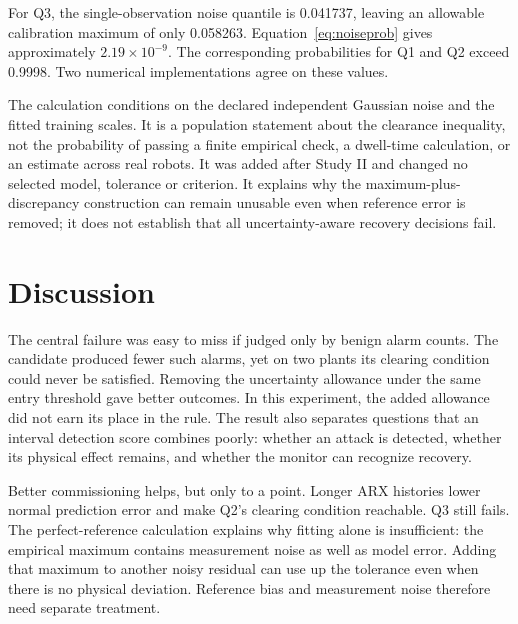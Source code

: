 \documentclass[11pt]{article}
\begin{document}
\begin{table}[htbp]\centering\small
\caption{Conditional perfect-reference diagnostic with $N=5{,}500$, $\delta=0.1$ and $\gamma=0.95$. The final column is the probability that a noise-only calibration maximum leaves enough margin for 95\% population feasibility.}\label{tab:noise}

\end{table}

For Q3, the single-observation noise quantile is 0.041737, leaving an allowable calibration maximum of only 0.058263. Equation~\ref{eq:noiseprob} gives approximately $2.19\times10^{-9}$. The corresponding probabilities for Q1 and Q2 exceed 0.9998. Two numerical implementations agree on these values.

The calculation conditions on the declared independent Gaussian noise and the fitted training scales. It is a population statement about the clearance inequality, not the probability of passing a finite empirical check, a dwell-time calculation, or an estimate across real robots. It was added after Study II and changed no selected model, tolerance or criterion. It explains why the maximum-plus-discrepancy construction can remain unusable even when reference error is removed; it does not establish that all uncertainty-aware recovery decisions fail.



\section{Discussion}
The central failure was easy to miss if judged only by benign alarm counts. The candidate produced fewer such alarms, yet on two plants its clearing condition could never be satisfied. Removing the uncertainty allowance under the same entry threshold gave better outcomes. In this experiment, the added allowance did not earn its place in the rule. The result also separates questions that an interval detection score combines poorly: whether an attack is detected, whether its physical effect remains, and whether the monitor can recognize recovery.

Better commissioning helps, but only to a point. Longer ARX histories lower normal prediction error and make Q2's clearing condition reachable. Q3 still fails. The perfect-reference calculation explains why fitting alone is insufficient: the empirical maximum contains measurement noise as well as model error. Adding that maximum to another noisy residual can use up the tolerance even when there is no physical deviation. Reference bias and measurement noise therefore need separate treatment.
\end{document}
